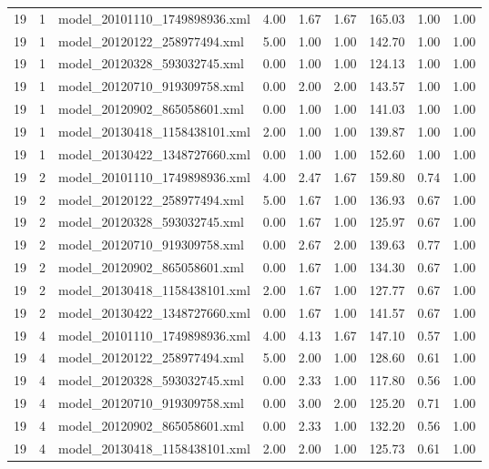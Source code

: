 \begin{table}[ht]
\begin{tabular}{rrlrrrrrr}
   19 &   1 & model\_20101110\_1749898936.xml & 4.00 & 1.67 & 1.67 & 165.03 & 1.00 & 1.00 \\ 
   19 &   1 & model\_20120122\_258977494.xml & 5.00 & 1.00 & 1.00 & 142.70 & 1.00 & 1.00 \\ 
   19 &   1 & model\_20120328\_593032745.xml & 0.00 & 1.00 & 1.00 & 124.13 & 1.00 & 1.00 \\ 
   19 &   1 & model\_20120710\_919309758.xml & 0.00 & 2.00 & 2.00 & 143.57 & 1.00 & 1.00 \\ 
   19 &   1 & model\_20120902\_865058601.xml & 0.00 & 1.00 & 1.00 & 141.03 & 1.00 & 1.00 \\ 
   19 &   1 & model\_20130418\_1158438101.xml & 2.00 & 1.00 & 1.00 & 139.87 & 1.00 & 1.00 \\ 
   19 &   1 & model\_20130422\_1348727660.xml & 0.00 & 1.00 & 1.00 & 152.60 & 1.00 & 1.00 \\ 
   19 &   2 & model\_20101110\_1749898936.xml & 4.00 & 2.47 & 1.67 & 159.80 & 0.74 & 1.00 \\ 
   19 &   2 & model\_20120122\_258977494.xml & 5.00 & 1.67 & 1.00 & 136.93 & 0.67 & 1.00 \\ 
   19 &   2 & model\_20120328\_593032745.xml & 0.00 & 1.67 & 1.00 & 125.97 & 0.67 & 1.00 \\ 
   19 &   2 & model\_20120710\_919309758.xml & 0.00 & 2.67 & 2.00 & 139.63 & 0.77 & 1.00 \\ 
   19 &   2 & model\_20120902\_865058601.xml & 0.00 & 1.67 & 1.00 & 134.30 & 0.67 & 1.00 \\ 
   19 &   2 & model\_20130418\_1158438101.xml & 2.00 & 1.67 & 1.00 & 127.77 & 0.67 & 1.00 \\ 
   19 &   2 & model\_20130422\_1348727660.xml & 0.00 & 1.67 & 1.00 & 141.57 & 0.67 & 1.00 \\ 
   19 &   4 & model\_20101110\_1749898936.xml & 4.00 & 4.13 & 1.67 & 147.10 & 0.57 & 1.00 \\ 
   19 &   4 & model\_20120122\_258977494.xml & 5.00 & 2.00 & 1.00 & 128.60 & 0.61 & 1.00 \\ 
   19 &   4 & model\_20120328\_593032745.xml & 0.00 & 2.33 & 1.00 & 117.80 & 0.56 & 1.00 \\ 
   19 &   4 & model\_20120710\_919309758.xml & 0.00 & 3.00 & 2.00 & 125.20 & 0.71 & 1.00 \\ 
   19 &   4 & model\_20120902\_865058601.xml & 0.00 & 2.33 & 1.00 & 132.20 & 0.56 & 1.00 \\ 
   19 &   4 & model\_20130418\_1158438101.xml & 2.00 & 2.00 & 1.00 & 125.73 & 0.61 & 1.00 \\ 

\end{tabular}
\end{table}
